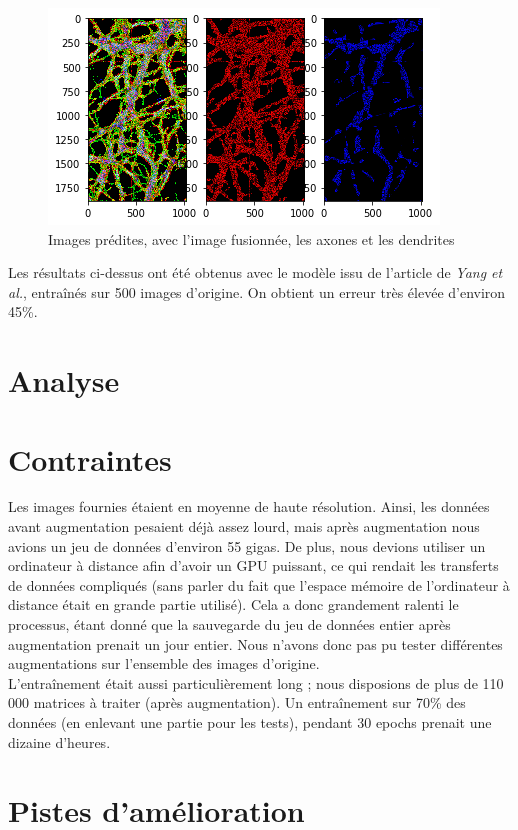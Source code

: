 \documentclass{report}
\begin{document}
\begin{figure}[H]
\centering
\includegraphics[scale=0.5]{"result"}
\caption{Images prédites, avec l'image fusionnée, les axones et les dendrites}
\end{figure}

Les résultats ci-dessus ont été obtenus avec le modèle issu de l'article de
\textit{Yang et al.}, entraînés sur 500 images d'origine. On obtient un erreur
très élevée d'environ 45\%.

\chapter{Analyse}

\chapter{Contraintes}

Les images fournies étaient en moyenne de haute résolution. Ainsi, les données
avant augmentation pesaient déjà assez lourd, mais après augmentation nous
avions un jeu de données d'environ 55 gigas. De plus, nous devions utiliser un
ordinateur à distance afin d'avoir un GPU puissant, ce qui rendait les transferts
de données compliqués (sans parler du fait que l'espace mémoire de l'ordinateur
à distance était en grande partie utilisé). Cela a donc grandement ralenti le
processus, étant donné que la sauvegarde du jeu de données entier après augmentation
prenait un jour entier. Nous n'avons donc pas pu tester différentes augmentations
sur l'ensemble des images d'origine. \\
L'entraînement était aussi particulièrement long ; nous disposions de plus de
110 000 matrices à traiter (après augmentation). Un entraînement sur 70\% des
données (en enlevant une partie pour les tests), pendant 30 epochs prenait une
dizaine d'heures.

\chapter{Pistes d'amélioration}
\end{document}
